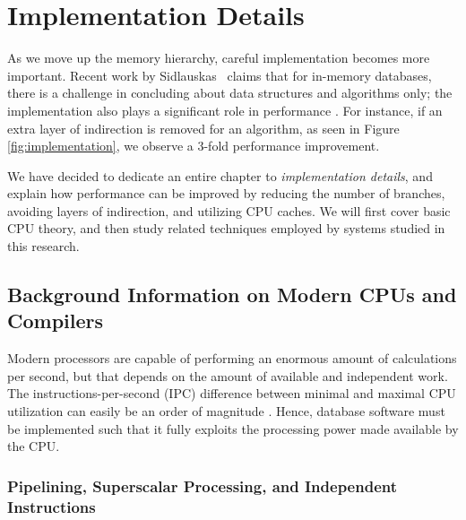 \chapter{Implementation Details}
\label{chap:Implementation Details}

As we move up the memory hierarchy, careful implementation becomes more important. Recent work by Sidlauskas \ea~claims that for in-memory databases, there is a challenge in concluding about data structures and algorithms only; the implementation also plays a significant role in performance \cite{Sidlauskas2014-ef}. For instance, if an extra layer of indirection is removed for an algorithm, as seen in Figure \ref{fig:implementation}, we observe a 3-fold performance improvement. 

We have decided to dedicate an entire chapter to \textit{implementation details}, and explain how performance can be improved by reducing the number of branches, avoiding layers of indirection, and utilizing CPU caches. We will first cover basic CPU theory, and then study related techniques employed by systems studied in this research.

\newpage

\section{Background Information on Modern CPUs and Compilers}
\label{sec:Background Information on Modern CPUs and Compilers}
Modern processors are capable of performing an enormous amount of calculations per second, but that depends on the amount of available and independent work. The instructions-per-second (IPC) difference between minimal and maximal CPU utilization can easily be an order of magnitude \cite{Boncz2005-wj}. Hence, database software must be implemented such that it fully exploits the processing power made available by the CPU.

\subsection{Pipelining, Superscalar Processing, and Independent Instructions}
\label{sub:Pipelining, Superscalar Processing, and Independent Instructions}

